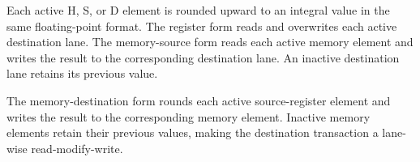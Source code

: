 Each active H, S, or D element is rounded upward to an integral value in the
same floating-point format. The register form reads and overwrites each active
destination lane. The memory-source form reads each active memory element and
writes the result to the corresponding destination lane. An inactive
destination lane retains its previous value.

The memory-destination form rounds each active source-register element and
writes the result to the corresponding memory element. Inactive memory elements
retain their previous values, making the destination transaction a lane-wise
read-modify-write.
